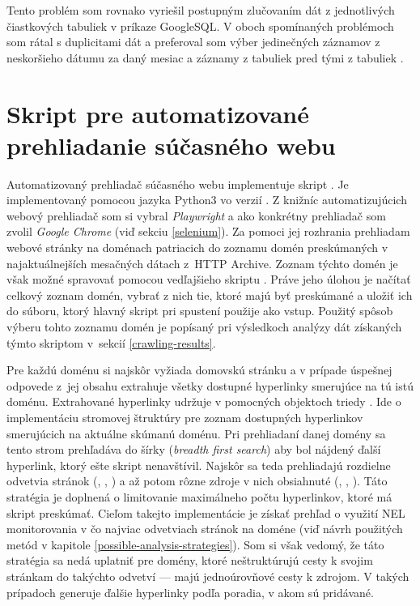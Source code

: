 Tento problém som rovnako vyriešil postupným zlučovaním dát z jednotlivých čiastkových tabuliek v príkaze GoogleSQL.
V oboch spomínaných problémoch som rátal s duplicitami dát a preferoval som výber jedinečných záznamov z neskoršieho dátumu za daný mesiac a záznamy z tabuliek  pred tými z tabuliek .


\section{Skript pre automatizované prehliadanie súčasného webu}
\label{crawl_and_store}

Automatizovaný prehliadač súčasného webu implementuje skript .
Je implementovaný pomocou jazyka Python3 vo verzií . 
Z knižníc automatizujúcich webový prehliadač som si vybral \textit{Playwright} a  ako konkrétny prehliadač som zvolil \textit{Google Chrome} (viď sekciu \ref{selenium}). 
Za pomoci jej rozhrania prehliadam webové stránky na doménach patriacich do zoznamu domén preskúmaných v najaktuálnejších mesačných dátach \mbox{z HTTP} Archive.
Zoznam týchto domén je však možné spravovať pomocou vedľajšieho skriptu .
Práve jeho úlohou je načítať celkový zoznam domén, vybrať z nich tie, ktoré majú byť preskúmané a uložiť ich do súboru, ktorý hlavný skript pri spustení použije ako vstup.
Použitý spôsob výberu tohto zoznamu domén je popísaný pri výsledkoch analýzy dát získaných týmto skriptom \mbox{v sekcií} \ref{crawling-results}. 

Pre každú doménu si najskôr vyžiada domovskú stránku a v prípade úspešnej odpovede \mbox{z jej} obsahu extrahuje všetky dostupné hyperlinky smerujúce na tú istú doménu.
Extrahované hyperlinky udržuje v pomocných objektoch triedy .
Ide o implementáciu stromovej štruktúry pre zoznam dostupných hyperlinkov smerujúcich na aktuálne skúmanú doménu. 
Pri prehliadaní danej domény sa tento strom prehľadáva do šírky (\textit{breadth first search}) aby bol nájdený ďalší hyperlink, ktorý ešte skript nenavštívil.
Najskôr sa teda prehliadajú rozdielne odvetvia stránok (, , ) a až potom rôzne zdroje v nich obsiahnuté (, , ).
Táto stratégia je doplnená o limitovanie maximálneho počtu hyperlinkov, ktoré má skript preskúmať.
Cieľom takejto implementácie je získať prehľad o využití NEL monitorovania v čo najviac odvetviach stránok na doméne (viď návrh použitých metód v kapitole \ref{possible-analysis-strategies}).
Som si však vedomý, že táto stratégia sa nedá uplatniť pre domény, ktoré neštruktúrujú cesty k svojim stránkam do takýchto odvetví --- majú jednoúrovňové cesty k zdrojom.
V takých prípadoch generuje  ďalšie hyperlinky podľa poradia, v akom sú pridávané.

